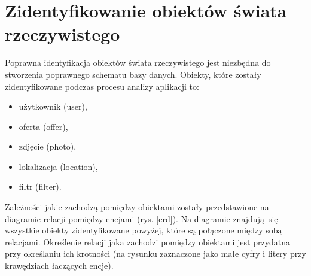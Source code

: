 
\section{Zidentyfikowanie obiektów świata rzeczywistego}
Poprawna identyfikacja obiektów świata rzeczywistego jest niezbędna do stworzenia poprawnego schematu bazy danych. Obiekty, które zostały zidentyfikowane podczas procesu analizy aplikacji to:
\begin{itemize}
\item użytkownik (user),
\item oferta (offer),
\item zdjęcie (photo),
\item lokalizacja (location),
\item filtr (filter).
\end{itemize}
Zależności jakie zachodzą pomiędzy obiektami zostały przedstawione na diagramie relacji pomiędzy encjami (rys. \ref{erd}). Na diagramie znajdują się wszystkie obiekty zidentyfikowane powyżej, które są połączone między sobą relacjami. Określenie relacji jaka zachodzi pomiędzy obiektami jest przydatna przy określaniu ich krotności (na rysunku zaznaczone jako małe cyfry i litery przy krawędziach łaczących encje).\\

\noindent
\begin{minipage}{\linewidth}
\label{erd}
\end{minipage}
